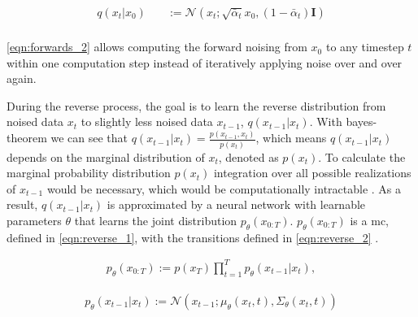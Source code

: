 \begin{equation}
  \label{eqn:forwards_2}
  \begin{align*}
    q(x_t | x_0) \quad & := \mathcal{N}(x_t; \sqrt{\bar{\alpha}_t} x_0, (1 - \bar{\alpha}_t) \textbf{I})\\
  \end{align*}
\end{equation}

\autoref{eqn:forwards_2} \cite{ho2020DenoisingDiffusionProbabilistic} allows computing the forward noising from $x_0$ to any timestep $t$ within one computation step instead of iteratively applying noise over and over again.
\newline

During the reverse process, the goal is to learn the reverse distribution from noised data $x_t$ to slightly less noised data $x_{t-1}$, $q(x_{t-1}|x_t)$.
With bayes-theorem we can see that $q(x_{t-1}|x_t) = \frac{p(x_{t-1},x_t)}{p(x_t)}$, which means $q(x_{t-1}|x_t)$ depends on the marginal distribution of $x_t$, denoted as $p(x_t)$.
To calculate the marginal probability distribution $p(x_t)$ integration over all possible realizations of $x_{t-1}$ would be necessary, which would be computationally intractable \cite{capel2022MasterThesisDenoising}.
As a result, $q(x_{t-1}|x_t)$ is approximated by a neural network with learnable parameters $\theta$ that learns the joint distribution $p_{\theta}(x_{0:T})$.
$p_{\theta}(x_{0:T})$ is a \gls{mc}, defined in \autoref{eqn:reverse_1}, with the transitions defined in \autoref{eqn:reverse_2} \cite{capel2022MasterThesisDenoising, ho2020DenoisingDiffusionProbabilistic}.

\begin{equation}
  \label{eqn:reverse_1}
  \begin{align*}
    p_{\theta}(x_{0:T}) := p(x_T) \prod_{t=1}^T p_{\theta}(x_{t-1} | x_t),
  \end{align*}
\end{equation}

\begin{equation}
  \label{eqn:reverse_2}
  \begin{align*}
    p_{\theta}(x_{t-1}|x_t) := \mathcal{N}(x_{t-1}; \mu_{\theta}(x_t, t), \Sigma_{\theta}(x_t, t))
  \end{align*}
\end{equation}
    
